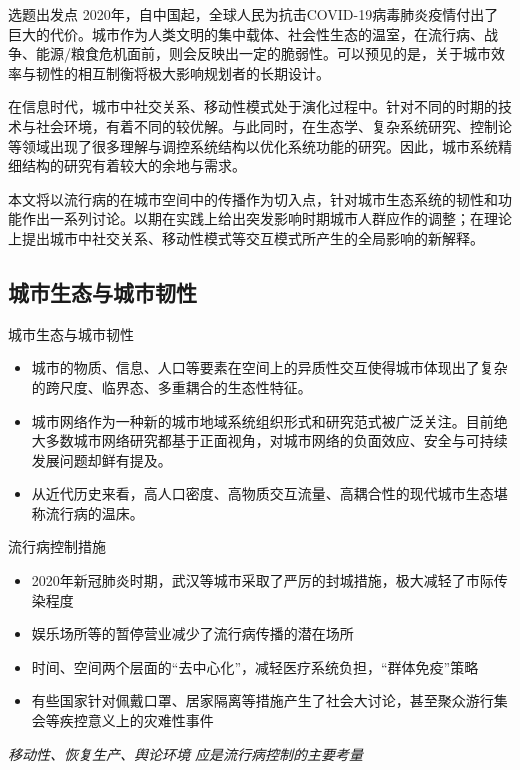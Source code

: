 \begin{frame}{选题出发点}
    2020年，自中国起，全球人民为抗击COVID-19病毒肺炎疫情付出了巨大的代价。城市作为人类文明的集中载体、社会性生态的温室，在流行病、战争、能源/粮食危机面前，则会反映出一定的脆弱性。可以预见的是，关于城市效率与韧性的相互制衡将极大影响规划者的长期设计。
    
    \vspace{0.3cm}
    
    在信息时代，城市中社交关系、移动性模式处于演化过程中。针对不同的时期的技术与社会环境，有着不同的较优解。与此同时，在生态学、复杂系统研究、控制论等领域出现了很多理解与调控系统结构以优化系统功能的研究。因此，城市系统精细结构的研究有着较大的余地与需求。
    
    \vspace{0.3cm}
    
    本文将以流行病的在城市空间中的传播作为切入点，针对城市生态系统的韧性和功能作出一系列讨论。以期在实践上给出突发影响时期城市人群应作的调整；在理论上提出城市中社交关系、移动性模式等交互模式所产生的全局影响的新解释。
\end{frame}{}
\subsection{城市生态与城市韧性}
\begin{frame}{城市生态与城市韧性}
    \begin{itemize}
    \item 城市的物质、信息、人口等要素在空间上的异质性交互使得城市体现出了复杂的跨尺度、临界态、多重耦合的生态性特征。
    \item 城市网络作为一种新的城市地域系统组织形式和研究范式被广泛关注。目前绝大多数城市网络研究都基于正面视角，对城市网络的负面效应、安全与可持续发展问题却鲜有提及。\cite{Xiu2019}
    \item 从近代历史来看，高人口密度、高物质交互流量、高耦合性的现代城市生态堪称流行病的温床。
\end{itemize}
\end{frame}

\begin{frame}{流行病控制措施}
    \begin{itemize}
        \item 2020年新冠肺炎时期，武汉等城市采取了严厉的封城措施，极大减轻了市际传染程度
        \item 娱乐场所等的暂停营业减少了流行病传播的潜在场所
        \item 时间、空间两个层面的“去中心化”，减轻医疗系统负担，“群体免疫”策略
        \item 有些国家针对佩戴口罩、居家隔离等措施产生了社会大讨论，甚至聚众游行集会等疾控意义上的灾难性事件
    \end{itemize}
    \vspace{0.5cm}
    \pause
    \begin{center}
    \large{
        \textit{移动性、恢复生产、舆论环境 应是流行病控制的主要考量}}
    \end{center}
\end{frame}

